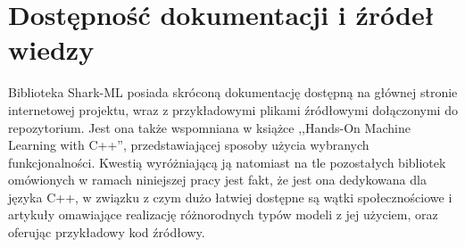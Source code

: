 
\section{Dostępność dokumentacji i źródeł wiedzy}

Biblioteka Shark-ML posiada skróconą dokumentację dostępną na głównej stronie internetowej projektu, wraz z przykładowymi plikami źródłowymi dołączonymi do repozytorium. Jest ona także wspomniana w książce ,,Hands-On Machine Learning with C++'', przedstawiającej sposoby użycia wybranych funkcjonalności. Kwestią wyróżniającą ją natomiast na tle pozostałych bibliotek omówionych w ramach niniejszej pracy jest fakt, że jest ona dedykowana dla języka C++, w związku z czym dużo łatwiej dostępne są wątki społecznościowe i artykuły omawiające realizację różnorodnych typów modeli z jej użyciem, oraz oferując przykładowy kod źródłowy.